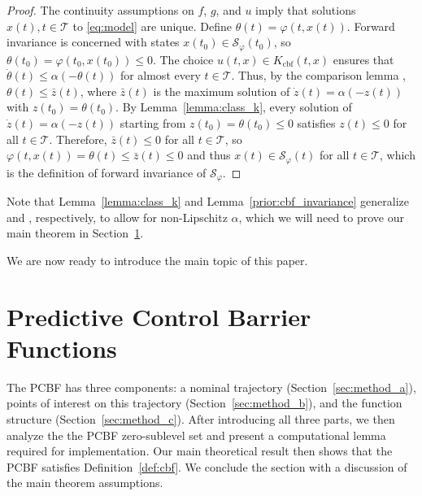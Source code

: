 \documentclass[10pt,conference]{ieeeconf}
\renewcommand{\(}{\left(}
\renewcommand{\)}{\right)}
\renewcommand{\[}{\left[}
\renewcommand{\]}{\right]}
\begin{document}
\begin{proof}
The continuity assumptions on $f$, $g$, and $u$ imply that solutions $x(t),t\in\mathcal{T}$ to \eqref{eq:model} are unique. Define ${\theta}(t) = {\varphi}(t,x(t))$. Forward invariance is concerned with states $x(t_0)\in\mathcal{S}_{\varphi}(t_0)$, so ${\theta}(t_0) = {\varphi}(t_0,x(t_0)) \leq 0$. The choice $u(t,x) \in K_\textrm{cbf}(t,x)$ ensures that $\dot{{\theta}}(t) \leq \alpha(-{\theta}(t))$ for almost every $t\in\mathcal{T}$. Thus, by the comparison lemma \cite[Lemma IX.2.6]{nonlipschitz}, ${\theta}(t) \leq \bar{z}(t)$, where $\bar{z}(t)$ is the maximum solution of $\dot{z}(t) = \alpha(-z(t))$ with $z(t_0) = {\theta}(t_0)$. By Lemma~\ref{lemma:class_k}, every solution of $\dot{z}(t) = \alpha(-z(t))$ starting from $z(t_0) = {\theta}(t_0) \leq 0$ satisfies $z(t) \leq 0$ for all $t \in \mathcal{T}$. Therefore, $\bar{z}(t)\leq 0$ for all $t\in\mathcal{T}$, so ${\varphi}(t,x(t)) = {\theta}(t) \leq \bar{z}(t) \leq 0$ and thus $x(t) \in \mathcal{S}_{\varphi}(t)$ for all $t \in \mathcal{T}$, which is the definition of forward invariance of $\mathcal{S}_{\varphi}$.
\end{proof}

\noindent
Note that Lemma~\ref{lemma:class_k} and Lemma~\ref{prior:cbf_invariance} generalize \cite[Lemma 1]{CBFs_STL} and \cite[Thm. 1]{CBFs_STL}, respectively, to allow for non-Lipschitz $\alpha$, which we will need to prove our main theorem in Section~\ref{sec:method}.

We are now ready to introduce the main topic of this paper.

\section{Predictive Control Barrier Functions} \label{sec:method}


The PCBF has three components: a nominal trajectory (Section~\ref{sec:method_a}), points of interest on this trajectory (Section~\ref{sec:method_b}), and the {function structure} (Section~\ref{sec:method_c}). After introducing all three parts, we then analyze the the PCBF zero-sublevel set and present a computational lemma required for implementation. Our main theoretical result then shows that the PCBF satisfies Definition~\ref{def:cbf}. We conclude the section with a discussion of the main theorem assumptions.
\end{document}
